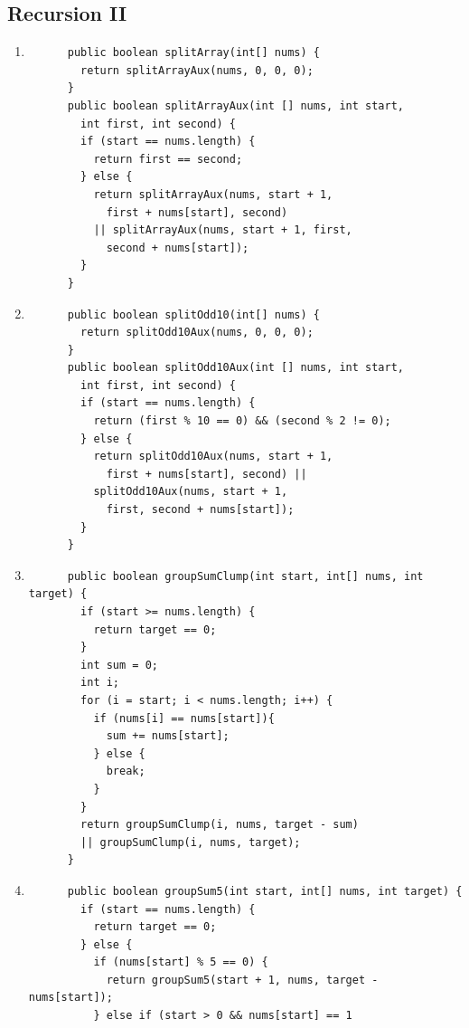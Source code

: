 \documentclass[a4paper,12pt]{article}
\begin{document}
    \subsection{Recursion II}
    \begin{enumerate}
      \item \begin{Verbatim}
      public boolean splitArray(int[] nums) {
        return splitArrayAux(nums, 0, 0, 0);
      }
      public boolean splitArrayAux(int [] nums, int start,
        int first, int second) {
        if (start == nums.length) {
          return first == second;
        } else {
          return splitArrayAux(nums, start + 1,
            first + nums[start], second)
          || splitArrayAux(nums, start + 1, first,
            second + nums[start]);
        }
      }
      \end{Verbatim}
      \item \begin{Verbatim}
      public boolean splitOdd10(int[] nums) {
        return splitOdd10Aux(nums, 0, 0, 0);
      }
      public boolean splitOdd10Aux(int [] nums, int start,
        int first, int second) {
        if (start == nums.length) {
          return (first % 10 == 0) && (second % 2 != 0);
        } else {
          return splitOdd10Aux(nums, start + 1,
            first + nums[start], second) ||
          splitOdd10Aux(nums, start + 1,
            first, second + nums[start]);
        }
      }
      \end{Verbatim}
      \item \begin{Verbatim}
      public boolean groupSumClump(int start, int[] nums, int target) {
        if (start >= nums.length) {
          return target == 0;
        }
        int sum = 0;
        int i;
        for (i = start; i < nums.length; i++) {
          if (nums[i] == nums[start]){
            sum += nums[start];
          } else {
            break;
          }
        }
        return groupSumClump(i, nums, target - sum)
        || groupSumClump(i, nums, target);
      }
      \end{Verbatim}
      \item \begin{Verbatim}
      public boolean groupSum5(int start, int[] nums, int target) {
        if (start == nums.length) {
          return target == 0;
        } else {
          if (nums[start] % 5 == 0) {
            return groupSum5(start + 1, nums, target - nums[start]);
          } else if (start > 0 && nums[start] == 1

\end{Verbatim}
\end{enumerate}
\end{document}
